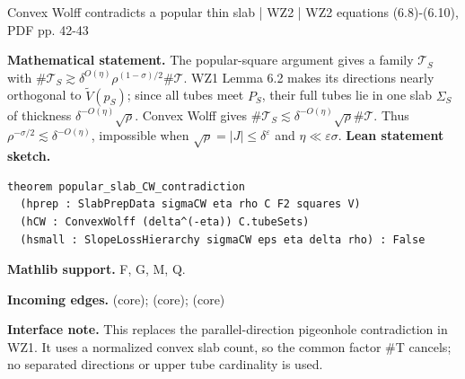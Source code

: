 \documentclass[10pt,a4paper]{article}
\newcommand{\nodecard}[1]{\hyperlink{node-#1}{\texttt{\detokenize{#1}}}}
\begin{document}
\begin{minipage}{\linewidth}
\hypertarget{node-W2SlabCount}{}
\begin{tcolorbox}[colback=white,colframe=slopefg,colbacktitle=slopebg,coltitle=ink,boxrule=0.45pt,arc=1.6mm,left=3mm,right=3mm,top=2mm,bottom=2mm,title={\sffamily\bfseries WZ2 Lemma 6.6: new Step 4 \hfill \texttt{W2SlabCount}}]
{\sffamily\small\color{muted}Convex Wolff contradicts a popular thin slab | WZ2 | WZ2 equations (6.8)-(6.10), PDF pp. 42-43}\par
\textbf{Mathematical statement.} The popular-square argument gives a family $\mathcal T_S$ with
$\#\mathcal T_S\gtrsim\delta^{O(\eta)}\rho^{(1-\sigma)/2}\#\mathcal T$.
WZ1 Lemma 6.2 makes its directions nearly orthogonal to $\widetilde V(p_S)$; since all tubes meet $P_S$, their full tubes lie in one slab $\Sigma_S$ of thickness $\delta^{-O(\eta)}\sqrt\rho$.
Convex Wolff gives $\#\mathcal T_S\lesssim\delta^{-O(\eta)}\sqrt\rho\#\mathcal T$.
Thus $\rho^{-\sigma/2}\lesssim\delta^{-O(\eta)}$, impossible when $\sqrt\rho=|J|\le\delta^\varepsilon$ and $\eta\ll\varepsilon\sigma$.
\smallskip\textbf{Lean statement sketch.}
\begin{Verbatim}[fontsize=\small,breaklines=true,breakanywhere=true,tabsize=2]
theorem popular_slab_CW_contradiction
  (hprep : SlabPrepData sigmaCW eta rho C F2 squares V)
  (hCW : ConvexWolff (delta^(-eta)) C.tubeSets)
  (hsmall : SlopeLossHierarchy sigmaCW eps eta delta rho) : False
\end{Verbatim}
{\footnotesize\textbf{Mathlib support.} F, G, M, Q.\par
\textbf{Incoming edges.} \nodecard{W1SlabPrep} (core); \nodecard{L6_2} (core); \nodecard{W2CWA} (core)\par}
{\footnotesize\textbf{Interface note.} This replaces the parallel-direction pigeonhole contradiction in WZ1. It uses a normalized convex slab count, so the common factor \#T cancels; no separated directions or upper tube cardinality is used.}
\end{tcolorbox}\end{minipage}\par\medskip
\end{document}
